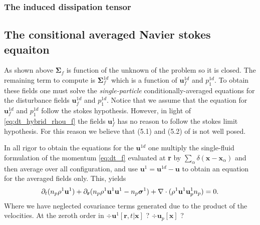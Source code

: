 \subsubsection*{The induced dissipation tensor}


\subsection*{The consitional averaged Navier stokes equaiton}
As shown above $\bm\Sigma_f$ is function of the unknown of the problem so it is closed. 
The remaining term to compute is $\bm\Sigma_f^{1d}$ which is a function of $\textbf{u}_f^{1d}$ and $p_1^{1d}$. 
To obtain these fields one must solve the \textit{single-particle} conditionally-averaged equations for the disturbance fields  $\textbf{u}_f^{1d}$ and $p_1^{1d}$. 
Notice that we assume that the equation for  $\textbf{u}_f^{1d}$ and $p_1^{1d}$ follow the stokes hypothesis. 
However, in light of \ref{eq:dt_hybrid_rhou_f} the fields $\textbf{u}_f^{1}$ has no reason to follow the stokes limit hypothesis. 
For this reason we believe that (5.1) and (5.2) of \citet{zhang1997momentum} is not well posed. 

In all rigor to obtain the equations for the $\textbf{u}^{1d}$ one multiply the single-fluid formulation of the momentum \eqref{eq:dt_f} evaluated at \textbf{r} by $\sum_\alpha \delta(\textbf{x}-\textbf{x}_\alpha)$ and then average over all configuration,  and use $\textbf{u}^1 = \textbf{u}^{1d} - \textbf{u}$ to obtain an equation for the averaged fields only. 
This, yields
\begin{equation*}
    \partial_t (n_p \rho^1 \textbf{u}^1)
    + {\partial_\textbf{r}}  (
        n_p \rho^1 \textbf{u}^1  \textbf{u}^1 
        - n_p \bm\sigma^1
        )
    + \mathbf{\nabla}\cdot (\rho^1 \textbf{u}^1 \textbf{u}_p^1  n_p )
    = 0. 
\end{equation*}
Where we have neglected covariance terms generated due to the product of the velocities.
At the zeroth order in $\div \textbf{u}^1[\textbf{r},t|\textbf{x}]$ ? $\div \textbf{u}_p[\textbf{x}]$ ? 


